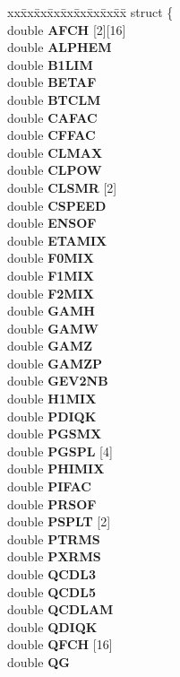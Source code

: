 \begin{CompactItemize}
\begin{tabbing}
\end{tabbing}\item 
\begin{tabbing}
xx\=xx\=xx\=xx\=xx\=xx\=xx\=xx\=xx\=\kill
struct \{\\
\>double {\bf AFCH} [2][16]\\
\>double {\bf ALPHEM}\\
\>double {\bf B1LIM}\\
\>double {\bf BETAF}\\
\>double {\bf BTCLM}\\
\>double {\bf CAFAC}\\
\>double {\bf CFFAC}\\
\>double {\bf CLMAX}\\
\>double {\bf CLPOW}\\
\>double {\bf CLSMR} [2]\\
\>double {\bf CSPEED}\\
\>double {\bf ENSOF}\\
\>double {\bf ETAMIX}\\
\>double {\bf F0MIX}\\
\>double {\bf F1MIX}\\
\>double {\bf F2MIX}\\
\>double {\bf GAMH}\\
\>double {\bf GAMW}\\
\>double {\bf GAMZ}\\
\>double {\bf GAMZP}\\
\>double {\bf GEV2NB}\\
\>double {\bf H1MIX}\\
\>double {\bf PDIQK}\\
\>double {\bf PGSMX}\\
\>double {\bf PGSPL} [4]\\
\>double {\bf PHIMIX}\\
\>double {\bf PIFAC}\\
\>double {\bf PRSOF}\\
\>double {\bf PSPLT} [2]\\
\>double {\bf PTRMS}\\
\>double {\bf PXRMS}\\
\>double {\bf QCDL3}\\
\>double {\bf QCDL5}\\
\>double {\bf QCDLAM}\\
\>double {\bf QDIQK}\\
\>double {\bf QFCH} [16]\\
\>double {\bf QG}\\

\end{tabbing}
\end{CompactItemize}
